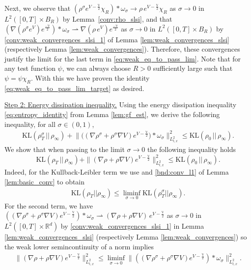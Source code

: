 \documentclass[reqno, 11pt]{amsart}
\numberwithin{equation}{section}
\theoremstyle{definition}
\begin{document}
Next, we observe that $(\rho^\sigma e^{V-\frac{\mathbb{V}}{2}}\chi_R)\ast\omega_\sigma \rightarrow \rho\, e^{V-\frac{\mathbb{V}}{2}}\chi_R$ as $\sigma\rightarrow 0$ in $L^2([0,T]\times B_R)$ by Lemma~\ref{conv:rho_slsi}, and that $(\nabla (\rho^\sigma e^V)e^{\frac{-\mathbb{V}}{2}})\ast\omega_\sigma\rightharpoonup \nabla (\rho\, e^V)e^{\frac{-\mathbb{V}}{2}}$ as $\sigma\rightarrow 0$ in $L^2([0,T]\times B_R)$ by \ref{conv:weak_convergences_slsi_1} of Lemma \ref{lem:weak_convergences_slsi} (respectively Lemma \ref{lem:weak_convergences}). Therefore, these convergences justify the limit for the last term in \eqref{eq:weak_eq_to_pass_lim}. Note that for any test function $\psi$, we can always choose $R>0$ sufficiently large such that $\psi=\psi\chi_R$. With this we have proven the identity \eqref{eq:weak_eq_to_pass_lim_target} as desired.

\smallskip

\underline{Step 2: Energy dissipation inequality.} Using the energy dissipation inequality \eqref{eq:entropy_identity} from Lemma \ref{lem:gf_est}, we derive the following inequality, for all $\sigma\in (0,1)$,
\begin{align*}
    \mathrm{KL}(\rho_T^\sigma\,||\,\rho_\infty)+\big\|\big((\nabla\rho^\sigma+\rho^\sigma\nabla V)e^{V-\frac{\mathbb{V}}{2}}\big)\ast\omega_\sigma\big\|_{L_{t,x}^2}^2\leq \mathrm{KL}(\rho_0\,||\,\rho_\infty).
\end{align*}
We show that when passing to the limit $\sigma\rightarrow 0$ the following inequality holds
\begin{equation}\label{eq:energy_dissipation_inequality_limit_scl_to_0}
    \mathrm{KL}(\rho_T\,||\,\rho_\infty)+\|(\nabla\rho+\rho\nabla V)e^{V-\frac{\mathbb{V}}{2}}\|_{L_{t,x}^2}^2\leq \mathrm{KL}(\rho_0\,||\,\rho_\infty).
\end{equation}
Indeed, for the Kullback-Leibler term we use \cite[Theorem 2.34]{ambrosio_fusco_pallara_2000_functions} and \ref{bnd:conv_l1} of Lemma \ref{lem:basic_conv} to obtain
\begin{align*}
    \mathrm{KL}(\rho_T || \rho_\infty)
    \leq \liminf_{\sigma\rightarrow 0}\mathrm{KL}(\rho_T^\sigma || \rho_\infty).
\end{align*}
For the second term, we have $((\nabla\rho^\sigma+\rho^\sigma\nabla V)e^{V-\frac{\mathbb{V}}{2}})\ast\omega_\sigma\rightharpoonup (\nabla\rho+\rho\nabla V)\, e^{V-\frac{\mathbb{V}}{2}}$ as $\sigma\rightarrow 0$ in $L^2([0,T]\times \mathbb{R}^{d})$ by \ref{conv:weak_convergences_slsi_1} in Lemma \ref{lem:weak_convergences_slsi} (respectively Lemma \ref{lem:weak_convergences}) so the weak lower semincontinuity of a norm implies
\begin{align*}
    \|(\nabla\rho+\rho\nabla V)e^{V-\frac{\mathbb{V}}{2}}\|_{L_{t,x}^2}^2\leq \liminf_{\sigma\rightarrow 0}\|((\nabla\rho^\sigma+\rho^\sigma\nabla V)e^{V-\frac{\mathbb{V}}{2}})\ast\omega_\sigma\|_{L_{t,x}^2}^2.
\end{align*}
\end{document}
